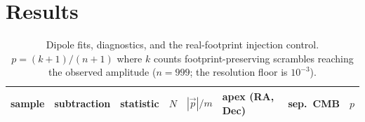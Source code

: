 \documentclass[twocolumn]{aastex631}
\begin{document}
\section{Results}
\label{sec:results}
\begin{table}
\centering
\caption{Dipole fits, diagnostics, and the real-footprint injection control.
$p = (k+1)/(n+1)$ where $k$ counts footprint-preserving scrambles reaching the observed
amplitude ($n=999$; the resolution floor is $10^{-3}$).}
\label{tab:legs}
\begin{tabular}{llllllll}
\hline
sample & subtraction & statistic & $N$ & $|\vec p|/m$ & apex (RA, Dec) & sep.\ CMB & $p$ \\
\hline

\end{tabular}
\end{table}
\end{document}
